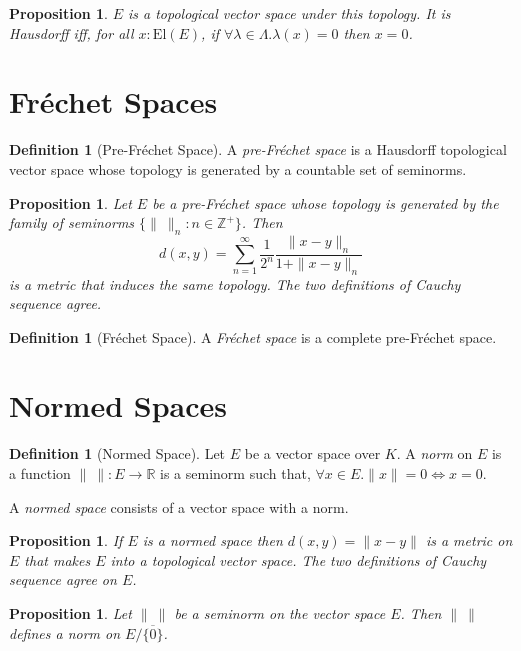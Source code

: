 \documentclass{book}
\newtheorem{prop}[ax]{Proposition}
\theoremstyle{definition}
\newtheorem{df}[ax]{Definition}
\newcommand{\El}[1]{\ensuremath{\mathrm{El} \left( {#1} \right)}}
\begin{document}
\begin{prop}
$E$ is a topological vector space under this topology. It is Hausdorff iff, for all $x : \El{E}$, if $\forall \lambda \in \Lambda. \lambda(x) = 0$ then $x = 0$.
\end{prop}

\section{Fr\'{e}chet Spaces}

\begin{df}[Pre-Fr\'{e}chet Space]
A \emph{pre-Fr\'{e}chet space} is a Hausdorff topological vector space whose topology is generated by a countable set of seminorms.
\end{df}

\begin{prop}
Let $E$ be a pre-Fr\'{e}chet space whose topology is generated by the family of seminorms $\{ \|\ \|_n : n \in \mathbb{Z}^+ \}$. Then
\[ d(x,y) = \sum_{n=1}^\infty \frac{1}{2^n} \frac{\|x-y\|_n}{1 + \|x-y\|_n} \]
is a metric that induces the same topology. The two definitions of Cauchy sequence agree.
\end{prop}

\begin{df}[Fr\'{e}chet Space]
A \emph{Fr\'{e}chet space} is a complete pre-Fr\'{e}chet space.
\end{df}

\section{Normed Spaces}

\begin{df}[Normed Space]
Let $E$ be a vector space over $K$. A \emph{norm} on $E$ is a function $\|\ \| : E \rightarrow \mathbb{R}$ is a seminorm such that, $\forall x \in E. \| x \| = 0 \Leftrightarrow x = 0$.

A \emph{normed space} consists of a vector space with a norm.
\end{df}

\begin{prop}
If $E$ is a normed space then $d(x,y) = \| x - y \|$ is a metric on $E$ that makes $E$ into a topological vector space. The two definitions of Cauchy sequence agree on $E$.
\end{prop}

\begin{prop}
Let $\|\ \|$ be a seminorm on the vector space $E$. Then $\|\ \|$ defines a norm on $E / \overline{\{0\}}$.
\end{prop}
\end{document}
